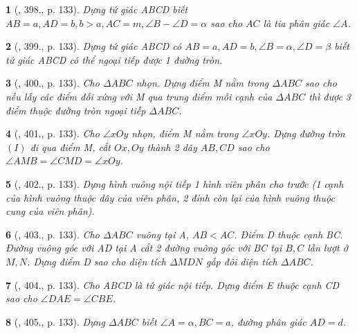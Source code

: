 \documentclass{article}
\newtheorem{baitoan}{}
\begin{document}
\begin{baitoan}[\cite{Binh_Toan_9_tap_2}, 398., p. 133]
	Dựng tứ giác ABCD biết $AB = a,AD = b,b > a,AC = m,\angle{B} - \angle{D} = \alpha$ sao cho $AC$ là tia phân giác $\angle{A}$.
\end{baitoan}

\begin{baitoan}[\cite{Binh_Toan_9_tap_2}, 399., p. 133]
	Dựng tứ giác ABCD có $AB = a,AD = b,\angle{B} = \alpha,\angle{D} = \beta$ biết tứ giác ABCD có thể ngoại tiếp được 1 đường tròn.
\end{baitoan}

\begin{baitoan}[\cite{Binh_Toan_9_tap_2}, 400., p. 133]
	Cho $\Delta ABC$ nhọn. Dựng điểm M nằm trong $\Delta ABC$ sao cho nếu lấy các điểm đối xứng với M qua trung điểm mỗi cạnh của $\Delta ABC$ thì được 3 điểm thuộc đường tròn ngoại tiếp $\Delta ABC$.
\end{baitoan}

\begin{baitoan}[\cite{Binh_Toan_9_tap_2}, 401., p. 133]
	Cho $\angle{xOy}$ nhọn, điểm M nằm trong $\angle{xOy}$. Dựng đường tròn $(I)$ đi qua điểm M, cắt $Ox,Oy$ thành 2 dây $AB,CD$ sao cho $\angle{AMB} = \angle{CMD} = \angle{xOy}$.
\end{baitoan}

\begin{baitoan}[\cite{Binh_Toan_9_tap_2}, 402., p. 133]
	Dựng hình vuông nội tiếp 1 hình viên phân cho trước (1 cạnh của hình vuông thuộc dây của viên phân, 2 đỉnh còn lại của hình vuông thuộc cung của viên phân).
\end{baitoan}

\begin{baitoan}[\cite{Binh_Toan_9_tap_2}, 403., p. 133]
	Cho $\Delta ABC$ vuông tại A, $AB < AC$. Điểm D thuộc cạnh BC. Đường vuông góc với AD tại A cắt 2 đường vuông góc với BC tại $B,C$ lần lượt ở $M,N$. Dựng điểm D sao cho diện tích $\Delta MDN$ gấp đôi diện tích $\Delta ABC$.
\end{baitoan}

\begin{baitoan}[\cite{Binh_Toan_9_tap_2}, 404., p. 133]
	Cho ABCD là tứ giác nội tiếp. Dựng điểm E thuộc cạnh CD sao cho $\angle{DAE} = \angle{CBE}$.
\end{baitoan}

\begin{baitoan}[\cite{Binh_Toan_9_tap_2}, 405., p. 133]
	Dựng $\Delta ABC$ biết $\angle{A} = \alpha,BC = a$, đường phân giác $AD = d$.
\end{baitoan}
\end{document}
